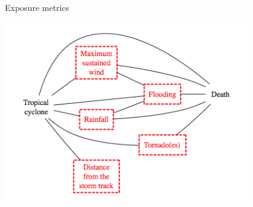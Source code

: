 \documentclass[ignorenonframetext,]{beamer}
\begin{document}
\begin{frame}{Exposure metrics}

\begin{center}\includegraphics[width=0.8\textwidth]{metric_relationships} \end{center}

\end{frame}
\end{document}
